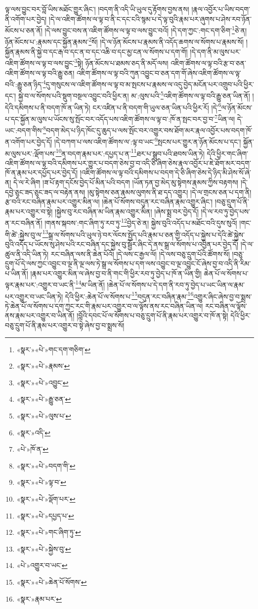 ལྟ་ལས་བྱུང་བར་བློ་ཡིས་མཐོང་གྱུར་ཞིང་། །བདག་ནི་འདི་ཡི་ཡུལ་དུ་རྟོགས་བྱས་ནས། །རྣལ་འབྱོར་པ་ཡིས་བདག་ནི་འགོག་པར་བྱེད། །དེ་ལ་འཇིག་ཚོགས་ལ་ལྟ་བ་ནི་ང་དང་ངའི་སྙམ་པ་དེ་ལྟ་བུའི་རྣམ་པར་ཞུགས་པ་ཤེས་རབ་ཉོན་མོངས་པ་ཅན་ནོ། །དེ་ལས་བྱུང་བས་ན་འཇིག་ཚོགས་ལ་ལྟ་བ་ལས་བྱུང་བའོ། །དེ་དག་ཀྱང་:གང་དག་ཅིག་\footnote{«སྣར་»«པེ་»གང་དག་གཅིག་}ཅེ་ན། ཉོན་མོངས་པ་:རྣམས་དང་སྐྱོན་རྣམས་\footnote{«སྣར་»«པེ་»རྣམས་}སོ། །དེ་ལ་ཉོན་མོངས་པ་རྣམས་ནི་འདོད་ཆགས་ལ་སོགས་པ་རྣམས་སོ། །སྐྱོན་རྣམས་ནི་སྐྱེ་བ་དང་རྒ་བ་དང་ན་བ་དང་འཆི་བ་དང་མྱ་ངན་ལ་སོགས་པ་དག་གོ། །དེ་དག་ནི་མ་ལུས་པར་འཇིག་ཚོགས་ལ་ལྟ་བ་ལས་བྱུང་\footnote{«སྣར་»«པེ་»འབྱུང་}སྟེ། ཉོན་མོངས་པ་ཐམས་ཅད་ནི་མདོ་ལས། འཇིག་ཚོགས་ལ་ལྟ་བའི་རྩ་བ་ཅན་འཇིག་ཚོགས་ལ་ལྟ་བའི་རྒྱུ་ཅན། འཇིག་ཚོགས་ལ་ལྟ་བའི་ཀུན་འབྱུང་བ་ཅན་དག་གོ་ཞེས་འཇིག་ཚོགས་ལ་ལྟ་བའི་:རྒྱུ་ཅན་ཉིད་\footnote{«སྣར་»«པེ་»རྒྱུ་ཅན་}དུ་གསུངས་ལ་འཇིག་ཚོགས་ལ་ལྟ་བ་མ་སྤངས་པ་རྣམས་ལ་འདུ་བྱེད་མངོན་པར་འགྲུབ་པའི་ཕྱིར་དང་། སྐྱེ་བ་ལ་སོགས་པའི་སྡུག་བསྔལ་འབྱུང་བའི་ཕྱིར་ན། མ་:ལུས་པའི་\footnote{«སྣར་»«པེ་»ལུས་པ་}འཇིག་ཚོགས་ལ་ལྟ་བའི་རྒྱུ་ཅན་ཡིན་ནོ། །དེའི་དམིགས་པ་ནི་བདག་ཁོ་ན་ཡིན་ཏེ། ངར་འཛིན་པ་ནི་བདག་གི་ཡུལ་ཅན་ཡིན་པའི་ཕྱིར་རོ། །དེ་\footnote{«སྣར་»འདི་}ལ་ཉོན་མོངས་པ་དང་སྐྱོན་མ་ལུས་པ་ཡོངས་སུ་སྤོང་བར་འདོད་པས་འཇིག་ཚོགས་ལ་ལྟ་བ་:ཁོ་ན་སྤང་བར་བྱ་བ་\footnote{«པེ་»ཁོ་ན་}ཡིན་ལ། དེ་ཡང་:བདག་གིས་\footnote{«སྣར་»«པེ་»བདག་གི་}བདག་མེད་པ་ཉིད་ཁོང་དུ་ཆུད་པ་ལས་སྤོང་བར་འགྱུར་བས་ཐོག་མར་རྣལ་འབྱོར་པས་བདག་ཁོ་ན་འགོག་པར་བྱེད་དོ། །དེ་བཀག་པ་ལས་འཇིག་ཚོགས་ལ་:ལྟ་བ་ཡང་\footnote{«སྣར་»«པེ་»ལྟ་བ་}སྤངས་པར་གྱུར་ན་ཉོན་མོངས་པ་དང་། སྐྱོན་མ་ལུས་པར་:ལྡོག་པས་\footnote{«སྣར་»«པེ་»ལྡོག་པར་}ན་བདག་རྣམ་པར་:དཔྱད་པ་ན་\footnote{«སྣར་»«པེ་»དཔྱད་པ་}ཐར་པ་སྒྲུབ་པའི་ཐབས་ཡིན་ཏེ། དེའི་ཕྱིར་གང་ཞིག་འཇིག་ཚོགས་ལ་ལྟ་བའི་དམིགས་པར་གྱུར་པ་བདག་ཅེས་བྱ་བ་འདི་ཅི་ཞིག་ཅེས་རྣལ་འབྱོར་པ་ཇེ་ཐོག་མར་བདག་ཁོ་ན་རྣམ་པར་དཔྱོད་པར་བྱེད་དོ། །འཇིག་ཚོགས་ལ་ལྟ་བའི་དམིགས་པ་བདག་དེ་ཅི་ཞིག་ཅེས་དེ་ཉིད་མི་ཤེས་སོ་ཞེ་ན། དེ་ལ་རེ་ཞིག །ཟ་པོ་རྟག་དངོས་བྱེད་པོ་མིན་པའི་བདག །ཡོན་ཏན་བྱ་མེད་མུ་སྟེགས་རྣམས་ཀྱིས་བརྟགས། །དེ་དབྱེ་ཅུང་ཟད་ཅུང་ཟད་ལ་བརྟེན་ནས། །མུ་སྟེགས་ཅན་རྣམས་ལུགས་ནི་ཐ་དད་འགྱུར། །དེ་ལ་གྲངས་ཅན་པ་དག་ནི། རྩ་བའི་རང་བཞིན་རྣམ་པར་འགྱུར་མིན་ལ། །ཆེན་པོ་སོགས་བདུན་རང་བཞིན་རྣམ་འགྱུར་ཞིང་། །བཅུ་དྲུག་པོ་ནི་རྣམ་པར་འགྱུར་བ་སྟེ། །སྐྱེས་བུ་རང་བཞིན་མ་ཡིན་རྣམ་འགྱུར་མིན། །ཞེས་སྨྲ་བར་བྱེད་དོ། །དེ་ལ་རབ་ཏུ་བྱེད་པས་ན་རང་བཞིན་ནོ། །གནས་སྐབས་:གང་ཞིག་ཏུ་རབ་ཏུ་\footnote{«སྣར་»«པེ་»གང་ཞིག་ཏུ་}བྱེད་ཅེ་ན། སྐྱེས་བུའི་འདོད་པ་མཐོང་བའི་དུས་སུའོ། །གང་གི་ཚེ་:སྐྱེས་བུ་ལ་\footnote{«སྣར་»«པེ་»སྐྱེས་བུ་}སྒྲ་ལ་སོགས་པའི་ཡུལ་ཉེ་བར་ལོངས་སྤྱོད་པའི་རྣམ་པ་ཅན་གྱི་འདོད་པ་སྐྱེས་པ་དེའི་ཚེ་སྐྱེས་བུའི་འདོད་པ་ཡོངས་སུ་ཤེས་པའི་རང་བཞིན་དང་སྐྱེས་བུ་སྦྱོར་ཞིང་དེ་ནས་སྒྲ་ལ་སོགས་པ་འབྱིན་པར་བྱེད་དོ། །དེ་ལ་ཚུལ་ནི་འདི་ཡིན་ཏེ། རང་བཞིན་ལས་ནི་ཆེན་པོའོ། །དེ་ལས་ང་རྒྱལ་ལོ། །དེ་ལས་བཅུ་དྲུག་པོའི་ཚོགས་སོ། །བཅུ་དྲུག་པོ་དེ་ལས་ཀྱང་འབྱུང་བ་ལྔ་ནི་ལྔ་ལས་ཏེ་སྒྲ་ལ་སོགས་པ་དག་ལས་འབྱུང་བ་ལྔ་འབྱུང་ངོ་ཞེས་བྱ་བ་འདི་ནི་རིམ་པ་ཡིན་ནོ། །རྣམ་པར་འགྱུར་མིན་ལ་ཞེས་བྱ་བ་ནི་གང་གི་ཕྱིར་རབ་ཏུ་བྱེད་པ་ཁོ་ན་ཡིན་གྱི། ཆེན་པོ་ལ་སོགས་པ་ལྟར་རྣམ་པར་:འགྱུར་བ་ཡང་ནི་\footnote{«པེ་»འགྱུར་བ་ཡང་}མ་ཡིན་ནོ། །ཆེན་པོ་ལ་སོགས་པ་དེ་དག་ནི་རབ་ཏུ་བྱེད་པ་ཡང་ཡིན་ལ་རྣམ་པར་འགྱུར་བ་ཡང་ཡིན་ཏེ། དེའི་ཕྱིར་:ཆེན་པོ་ལ་སོགས་པ་\footnote{«སྣར་»«པེ་»ཆེན་པོ་སོགས་}བདུན་རང་བཞིན་རྣམ་\footnote{«སྣར་»རྣམ་པར་}འགྱུར་ཞིང་ཞེས་བྱ་བ་སྨྲས་ཏེ་ཆེན་པོ་ལ་སོགས་པ་དག་ཀྱང་རང་གི་རྣམ་པར་འགྱུར་བ་ལ་ལྟོས་ནས་རང་བཞིན་ཡིན་ལ། རང་བཞིན་ལ་ལྟོས་ནས་རྣམ་པར་འགྱུར་བ་ཡིན་ནོ། །བློའི་དབང་པོ་ལ་སོགས་པ་བཅུ་དྲུག་པོ་ནི་རྣམ་པར་འགྱུར་བ་ཁོ་ན་སྟེ། དེའི་ཕྱིར་བཅུ་དྲུག་པོ་ནི་རྣམ་པར་འགྱུར་བ་སྟེ་ཞེས་བྱ་བ་སྨྲས་སོ། 